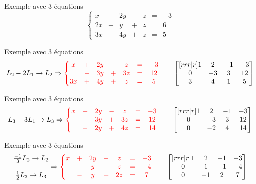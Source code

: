 \documentclass[french]{beamer}
\begin{document}
\begin{frame}{Exemple avec 3 équations}
\[
	\left\{
	\begin{matrix}
	x &+& 2y &-& z &=& -3\\
	2x &+& y &+& z &=& 6\\
	3x &+& 4y &+& z &=& 5
	\end{matrix}\right.
\]
\end{frame}

\begin{frame}{Exemple avec 3 équations}
\[
L_2 -2L_1 \rightarrow L_2 \Rightarrow
\color{red}
\left\{
	\begin{matrix}
	x &+& 2y &-& z &=& -3\\
	 &-& 3y &+& 3z &=& 12\\
	3x &+& 4y &+& z &=& 5
	\end{matrix}\right.
	\qquad\color{black}
	\begin{bmatrix}[rrr|r]
1 & 2 & -1 & -3 \\
0 & -3 & 3 & 12 \\
3 & 4 & 1 & 5
\end{bmatrix}
\]
\end{frame}

\begin{frame}{Exemple avec 3 équations}
\[
L_3 -3L_1 \rightarrow L_3 \Rightarrow
\color{red}
\left\{
	\begin{matrix}
	x &+& 2y &-& z &=& -3\\
	&-& 3y &+& 3z &=& 12\\
	&-& 2y &+& 4z &=& 14
	\end{matrix}\right.
	\qquad\color{black}
	\begin{bmatrix}[rrr|r]
1 & 2 & -1 & -3 \\
0 & -3 & 3 & 12 \\
0 & -2 & 4 & 14
\end{bmatrix}
\]
\end{frame}

\begin{frame}{Exemple avec 3 équations}
\[
\begin{matrix}
\frac{-1}{3}L_2 \rightarrow L_2 \\
\\
\frac{1}{2}L_3 \rightarrow L_3
\end{matrix}
 \Rightarrow
\color{red}
\left\{
	\begin{matrix}
	x &+& 2y &-& z &=& -3\\
	&& y &-& z &=& -4\\
	&-& y &+& 2z &=& 7
	\end{matrix}\right.
	\qquad\color{black}
	\begin{bmatrix}[rrr|r]
1 & 2 & -1 & -3 \\
0 & 1 & -1 & -4 \\
0 & -1 & 2 & 7
\end{bmatrix}
\]
\end{frame}
\end{document}
